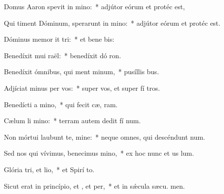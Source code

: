 \item Domus Aaron spevit in mino:~* adjútor eórum et protéc  est,
\item Qui timent Dóminum, sperarunt in mino:~* adjútor eórum et protéc  est.
\item Dóminus memor it tri:~* et bene bis:
\item Benedíxit mui raël:~* benedíxit dó ron.
\item Benedíxit ómnibus, qui ment minum,~* pusíllis  bus.
\item Adjíciat minus per vos:~* super vos, et super fí tros.
\item Benedícti  a mino,~* qui fecit cæ,  ram.
\item Cælum li mino:~* terram autem dedit fí num.
\item Non mórtui laubunt te, mine:~* neque omnes, qui descéndunt  num.
\item Sed nos qui vívimus, benecimus mino,~* ex hoc nunc et us  lum.
\item Glória tri, et lio,~* et Spirí to.
\item Sicut erat in princípio, et , et per,~* et in sǽcula sæcu. men.
